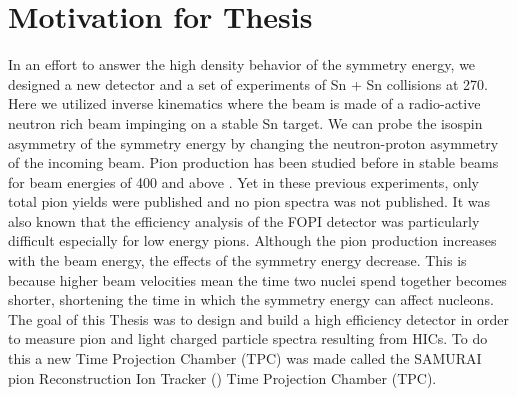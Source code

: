 \section{Motivation for Thesis}
In an effort to answer the high density behavior of the symmetry energy, we designed a new detector and a set of experiments of Sn + Sn collisions at \SI{270}{\MeVA}. Here we utilized inverse kinematics where the beam is made of a radio-active neutron rich beam impinging on a stable Sn target. We can probe the isospin asymmetry of the symmetry energy by changing the neutron-proton asymmetry of the incoming beam. Pion production has been studied before in stable beams for beam energies of \SI{400}{\MeVA} and above \cite{fopi}. Yet in these previous experiments, only total pion yields were published and no pion spectra was not published. It was also known that the efficiency analysis of the FOPI detector was particularly difficult especially for low energy pions. Although the pion production increases with the beam energy, the effects of the symmetry energy decrease. This is because higher beam velocities mean the time two nuclei spend together becomes shorter, shortening the time in which the symmetry energy can affect nucleons.  The goal of this Thesis was to design and build a high efficiency detector in order to measure pion and light charged particle spectra resulting from HICs. To do this a new Time Projection Chamber (TPC) was made called the SAMURAI pion Reconstruction Ion Tracker (\spirit) Time Projection Chamber (TPC).





